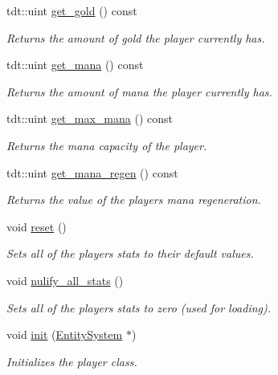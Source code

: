 \begin{DoxyCompactItemize}
tdt\+::uint \hyperlink{class_player_a7cb2397ce4a31c16fc4d6e317f4e4adb}{get\+\_\+gold} () const 
\begin{DoxyCompactList}\small\item\em Returns the amount of gold the player currently has. \end{DoxyCompactList}\item 
tdt\+::uint \hyperlink{class_player_a9570c9676533eba78d52a3784e341353}{get\+\_\+mana} () const 
\begin{DoxyCompactList}\small\item\em Returns the amount of mana the player currently has. \end{DoxyCompactList}\item 
tdt\+::uint \hyperlink{class_player_a3266a8648886aaa1017c0971c02a5173}{get\+\_\+max\+\_\+mana} () const 
\begin{DoxyCompactList}\small\item\em Returns the mana capacity of the player. \end{DoxyCompactList}\item 
tdt\+::uint \hyperlink{class_player_afe60be6999f0b491d101590f3689dd1c}{get\+\_\+mana\+\_\+regen} () const 
\begin{DoxyCompactList}\small\item\em Returns the value of the player\textquotesingle{}s mana regeneration. \end{DoxyCompactList}\item 
void \hyperlink{class_player_a1af5d39f7bac2aeaa1e30c7dda2332fa}{reset} ()
\begin{DoxyCompactList}\small\item\em Sets all of the player\textquotesingle{}s stats to their default values. \end{DoxyCompactList}\item 
void \hyperlink{class_player_ab153b2d29f2db9456646e67fd491392d}{nulify\+\_\+all\+\_\+stats} ()
\begin{DoxyCompactList}\small\item\em Sets all of the player\textquotesingle{}s stats to zero (used for loading). \end{DoxyCompactList}\item 
void \hyperlink{class_player_a30c0caf810fab1b1676a6ce4f76b1f42}{init} (\hyperlink{class_entity_system}{Entity\+System} $\ast$)
\begin{DoxyCompactList}\small\item\em Initializes the player class. \end{DoxyCompactList}\item 

\end{DoxyCompactItemize}
